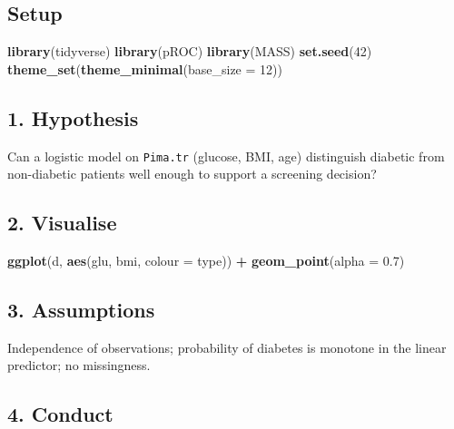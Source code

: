 \documentclass[
]{article}
\newenvironment{Shaded}{\begin{snugshade}}{\end{snugshade}}
\newcommand{\AttributeTok}[1]{\textcolor[rgb]{0.13,0.29,0.53}{#1}}
\newcommand{\DecValTok}[1]{\textcolor[rgb]{0.00,0.00,0.81}{#1}}
\newcommand{\FloatTok}[1]{\textcolor[rgb]{0.00,0.00,0.81}{#1}}
\newcommand{\FunctionTok}[1]{\textcolor[rgb]{0.13,0.29,0.53}{\textbf{#1}}}
\newcommand{\NormalTok}[1]{#1}
\newcommand{\SpecialCharTok}[1]{\textcolor[rgb]{0.81,0.36,0.00}{\textbf{#1}}}
\begin{document}
\subsection{Setup}\label{setup}

\begin{Shaded}
\begin{Highlighting}[]
\FunctionTok{library}\NormalTok{(tidyverse)}
\FunctionTok{library}\NormalTok{(pROC)}
\FunctionTok{library}\NormalTok{(MASS)}
\FunctionTok{set.seed}\NormalTok{(}\DecValTok{42}\NormalTok{)}
\FunctionTok{theme\_set}\NormalTok{(}\FunctionTok{theme\_minimal}\NormalTok{(}\AttributeTok{base\_size =} \DecValTok{12}\NormalTok{))}
\end{Highlighting}
\end{Shaded}

\subsection{1. Hypothesis}\label{hypothesis}

Can a logistic model on \texttt{Pima.tr} (glucose, BMI, age) distinguish
diabetic from non-diabetic patients well enough to support a screening
decision?

\subsection{2. Visualise}\label{visualise}

\begin{Shaded}
\begin{Highlighting}[]
\FunctionTok{ggplot}\NormalTok{(d, }\FunctionTok{aes}\NormalTok{(glu, bmi, }\AttributeTok{colour =}\NormalTok{ type)) }\SpecialCharTok{+} \FunctionTok{geom\_point}\NormalTok{(}\AttributeTok{alpha =} \FloatTok{0.7}\NormalTok{)}
\end{Highlighting}
\end{Shaded}

\subsection{3. Assumptions}\label{assumptions}

Independence of observations; probability of diabetes is monotone in the
linear predictor; no missingness.

\subsection{4. Conduct}\label{conduct}
\end{document}
